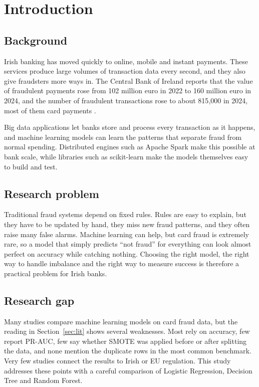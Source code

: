 \documentclass[12pt,a4paper]{article}
\begin{document}
\newpage
\tableofcontents
\newpage

\section{Introduction}\label{sec:intro}

\subsection{Background}
Irish banking has moved quickly to online, mobile and instant payments. These services produce large volumes of transaction data every second, and they also give fraudsters more ways in. The Central Bank of Ireland reports that the value of fraudulent payments rose from 102 million euro in 2022 to 160 million euro in 2024, and the number of fraudulent transactions rose to about 815{,}000 in 2024, most of them card payments \citep{cbi2025fraud}.

Big data applications let banks store and process every transaction as it happens, and machine learning models can learn the patterns that separate fraud from normal spending. Distributed engines such as Apache Spark \citep{zaharia2016spark} make this possible at bank scale, while libraries such as scikit-learn \citep{pedregosa2011scikit} make the models themselves easy to build and test.

\subsection{Research problem}
Traditional fraud systems depend on fixed rules. Rules are easy to explain, but they have to be updated by hand, they miss new fraud patterns, and they often raise many false alarms. Machine learning can help, but card fraud is extremely rare, so a model that simply predicts ``not fraud'' for everything can look almost perfect on accuracy while catching nothing. Choosing the right model, the right way to handle imbalance and the right way to measure success is therefore a practical problem for Irish banks.

\subsection{Research gap}
Many studies compare machine learning models on card fraud data, but the reading in Section~\ref{sec:lit} shows several weaknesses. Most rely on accuracy, few report PR-AUC, few say whether SMOTE was applied before or after splitting the data, and none mention the duplicate rows in the most common benchmark. Very few studies connect the results to Irish or EU regulation. This study addresses these points with a careful comparison of Logistic Regression, Decision Tree and Random Forest.
\end{document}
